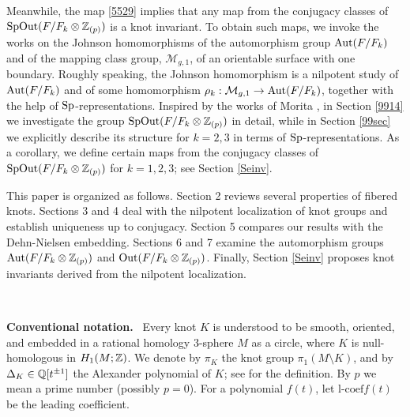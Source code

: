 \documentclass{article}
\theoremstyle{plain}
\theoremstyle{definition}
\newcommand{\ra}{\rightarrow}
\newcommand{\Q}{{\Bbb Q}}
\newcommand{\Z}{{\Bbb Z}}
\newcommand{\Aut}{{\rm Aut}}
\newcommand{\Out}{{\rm Out}}
\newcommand{\Sp}{{\rm Sp}}
\newcommand{\SpOut}{{\rm SpOut}}
\newcommand{\lc}{{\mathrm{l}\textrm{-}\mathrm{coef}}}
\begin{document}
{Meanwhile, the map \eqref{5529} implies that any map from the conjugacy classes of $\SpOut(F/F_{k } \otimes \Z_{(p)}) $ is a knot invariant. To obtain such maps, we invoke the works on the Johnson homomorphisms of the automorphism group $\Aut(F/F_{k}) $ and of the mapping class group, $\mathcal{M}_{g,1}$, of an orientable surface with one boundary. Roughly speaking, the Johnson homomorphism is a nilpotent study of $\Aut(F/F_{k})$ and of some homomorphism $\rho_k: \mathcal{M}_{g,1} \ra \Aut(F/F_{k})$, together with the help of $\Sp$-representations. Inspired by the works of Morita \cite{Mo,Mo2,Mo3}, in Section \ref{9914} we investigate the group $\SpOut(F/F_{k} \otimes \Z_{(p)})$ in detail, while in Section \ref{99sec} we explicitly describe its structure for $k=2,3$ in terms of $\Sp$-representations. As a corollary, we define certain maps from the conjugacy classes of $\SpOut(F/F_{k} \otimes \Z_{(p)})$ for $k=1,2,3$; see Section \ref{Seinv}.


This paper is organized as follows. Section 2 reviews several properties of fibered knots. Sections 3 and 4 deal with the nilpotent localization of knot groups and establish uniqueness up to conjugacy. Section 5 compares our results with the Dehn-Nielsen embedding. Sections 6 and 7 examine the automorphism groups $\Aut(F/F_k \otimes \Z_{(p)})$ and $\Out(F/F_k \otimes \Z_{(p)})$. Finally, Section \ref{Seinv} proposes knot invariants derived from the nilpotent localization.

\

\noindent
{\bf Conventional notation.} \ Every knot $K$ is understood to be smooth, oriented, and embedded in a rational homology 3-sphere $M$ as a circle, where $K$ is null-homologous in $H_1(M;\Z)$. We denote by $\pi_K$ the knot group $\pi_1(M \setminus K )$, and by $\Delta_K \in \Q[t^{\pm 1 }]$ the Alexander polynomial of $K$; see \cite{Lic} for the definition. By $p$ we mean a prime number (possibly $p=0$). For a polynomial $f(t)$, let $\lc f(t)$ be the leading coefficient.

}
\end{document}
